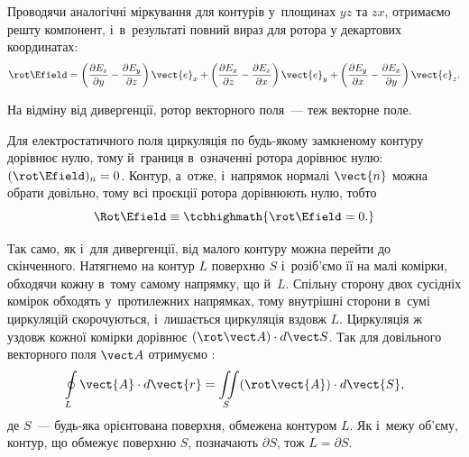 Проводячи аналогічні міркування для контурів у~площинах $yz$ та $zx$, отримаємо решту
компонент, і~в~результаті повний вираз для ротора у декартових координатах:
\begin{equation}
	\rot\Efield = \left( \frac{\partial E_z}{\partial y} - \frac{\partial
		E_y}{\partial z} \right)\vect{e}_x + \left( \frac{\partial
		E_x}{\partial z} - \frac{\partial E_z}{\partial x} \right)\vect{e}_y +
	\left( \frac{\partial E_y}{\partial x} - \frac{\partial E_x}{\partial y}
	\right)\vect{e}_z.
\end{equation}

На відміну від дивергенції, ротор векторного поля~--- теж векторне поле.

Для електростатичного поля циркуляція по будь-якому замкненому контуру дорівнює нулю,
тому й~границя в~означенні ротора дорівнює нулю: $(\rot\Efield)_n = 0$. Контур, а~отже,
і~напрямок нормалі $\vect{n}$ можна обрати довільно, тому всі проєкції ротора дорівнюють
нулю, тобто
\begin{equation*}
	\Rot\Efield \equiv \tcbhighmath{
		\rot\Efield = 0.
	}
\end{equation*}

Так само, як і~для дивергенції, від малого контуру можна перейти до скінченного. Натягнемо
на контур $L$ поверхню $S$ і~розіб'ємо її на малі комірки, обходячи кожну в~тому самому
напрямку, що й~$L$. Спільну сторону двох сусідніх комірок обходять у~протилежних
напрямках, тому внутрішні сторони в~сумі циркуляцій скорочуються, і~лишається циркуляція
вздовж $L$. Циркуляція ж уздовж кожної комірки дорівнює $(\rot\vect A)\cdot d\vect S$.
Так для довільного векторного поля $\vect A$ отримуємо :
\begin{equation}
	\oint\limits_L \vect{A} \cdot d\vect{r} = \iint\limits_S (\rot\vect{A}) \cdot d\vect{S},
\end{equation}
де $S$~--- будь-яка орієнтована поверхня, обмежена контуром $L$. Як і~межу об'єму,
контур, що обмежує поверхню $S$, позначають $\partial S$, тож $L = \partial S$.



